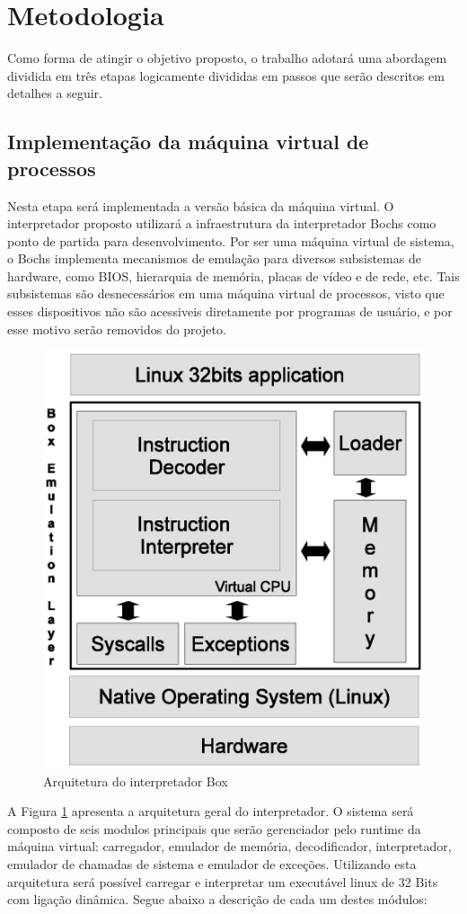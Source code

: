 \documentclass[11pt,twoside]{article}
\begin{document}
\section{Metodologia}  \label{sec:metodologia}

Como forma de atingir o objetivo proposto, o trabalho adotará uma abordagem 
dividida em três etapas logicamente divididas em passos que serão descritos 
em detalhes a seguir.

\subsection{Implementação da máquina virtual de processos}

Nesta etapa será implementada a versão básica da máquina virtual. O 
interpretador proposto utilizará a infraestrutura da interpretador Bochs 
como ponto de partida para desenvolvimento. Por ser uma máquina virtual de 
sistema, o Bochs implementa mecanismos de emulação para diversos subsistemas 
de hardware, como BIOS, hierarquia de memória, placas de vídeo e de rede, etc. 
Tais subsistemas são desnecessários em uma máquina virtual de processos, visto 
que esses dispositivos não são acessiveis diretamente por programas de usuário, 
e por esse motivo serão removidos do projeto.

\begin{figure}[h]
 \centering
 \includegraphics[width=0.5\columnwidth]{./figures/box-architecture.eps}
 \caption{Arquitetura do interpretador Box}
 \label{fig:box-architecture}
\end{figure}

A Figura \ref{fig:box-architecture} apresenta a arquitetura geral do interpretador.
O sistema será composto de seis modulos principais que serão gerenciador pelo runtime
da máquina virtual: carregador, emulador de memória, decodificador, interpretador, 
emulador de chamadas de sistema e emulador de exceções. Utilizando esta arquitetura 
será possível carregar e interpretar um executável linux de 32 Bits com ligação dinâmica. 
Segue abaixo a descrição de cada um destes módulos:
\end{document}
